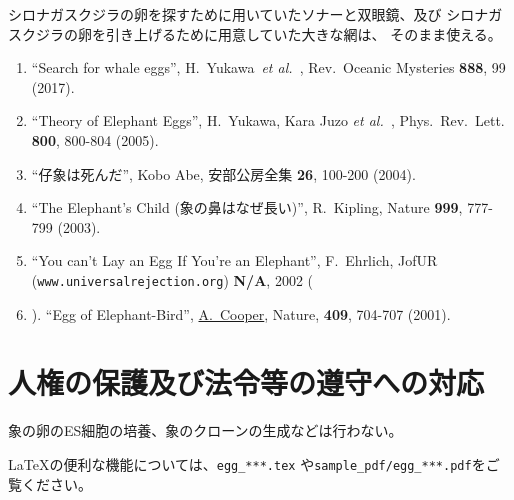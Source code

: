 \documentclass[11pt,a4j,dvipdfmx]{jarticle} 					%
\newcommand{\研究課題名}{象の卵}
\newcommand{\研究機関名}{逢坂大学}
\newcommand{\研究代表者氏名}{湯川秀樹}
\newcommand{\研究期間の最終元号年度}{4}  %
\newcommand{\paper}[6]{%
	\item ``#1'', #2, #3 {\bf #4}, #5 (#6).			%
}
\newcommand{\etal}{\textit{et al.\ }}
\newcommand{\yukawa}{H.~Yukawa}					%
\newcommand{\prl}{Phys.\ Rev.\ Lett.\ }		%
\begin{document}
	シロナガスクジラの卵を探すために用いていたソナーと双眼鏡、及び
	シロナガスクジラの卵を引き上げるために用意していた大きな網は、
	そのまま使える。
	\begin{enumerate}
		\paper{Search for whale eggs}{\yukawa\ \etal}{Rev.\ Oceanic Mysteries}{888}{99}{2017}
			\label{pub:whale}
				
		\paper{Theory of Elephant Eggs}{\yukawa, Kara Juzo \etal}{\prl}{800}{800-804}{2005}
			\label{pub:theoegg}
				
		\paper{仔象は死んだ}{Kobo Abe}{安部公房全集}{26}{100-200}{2004}
		
		\paper{The Elephant's Child (象の鼻はなぜ長い)}{R.~Kipling}{Nature}{999}{777-799}{2003}

		\paper{You can't Lay an Egg If You're an Elephant}{F.~Ehrlich}
			{JofUR\\({\tt www.universalrejection.org})}{{\bf N/A}}{2002}
		
		\item ``Egg of Elephant-Bird'', 
				\underline{A.~Cooper},
				Nature, {\bf 409}, 704-707 (2001).	%
	\end{enumerate}




\section{人権の保護及び法令等の遵守への対応}

	象の卵のES細胞の培養、象のクローンの生成などは行わない。

	\LaTeX の便利な機能については、\texttt{egg\_***.tex} や\texttt{sample\_pdf/egg\_***.pdf}をご覧ください。



\end{document}
